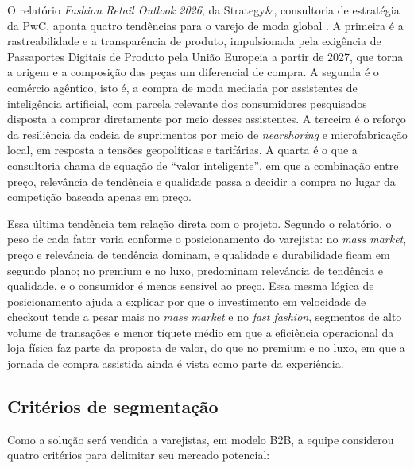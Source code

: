 O relatório \textit{Fashion Retail Outlook 2026}, da Strategy\&, consultoria de estratégia da PwC, aponta quatro tendências para o varejo de moda global \cite{strategyand2026outlook}. A primeira é a rastreabilidade e a transparência de produto, impulsionada pela exigência de Passaportes Digitais de Produto pela União Europeia a partir de 2027, que torna a origem e a composição das peças um diferencial de compra. A segunda é o comércio agêntico, isto é, a compra de moda mediada por assistentes de inteligência artificial, com parcela relevante dos consumidores pesquisados disposta a comprar diretamente por meio desses assistentes. A terceira é o reforço da resiliência da cadeia de suprimentos por meio de \textit{nearshoring} e microfabricação local, em resposta a tensões geopolíticas e tarifárias. A quarta é o que a consultoria chama de equação de ``valor inteligente'', em que a combinação entre preço, relevância de tendência e qualidade passa a decidir a compra no lugar da competição baseada apenas em preço.

Essa última tendência tem relação direta com o projeto. Segundo o relatório, o peso de cada fator varia conforme o posicionamento do varejista: no \textit{mass market}, preço e relevância de tendência dominam, e qualidade e durabilidade ficam em segundo plano; no premium e no luxo, predominam relevância de tendência e qualidade, e o consumidor é menos sensível ao preço. Essa mesma lógica de posicionamento ajuda a explicar por que o investimento em velocidade de checkout tende a pesar mais no \textit{mass market} e no \textit{fast fashion}, segmentos de alto volume de transações e menor tíquete médio em que a eficiência operacional da loja física faz parte da proposta de valor, do que no premium e no luxo, em que a jornada de compra assistida ainda é vista como parte da experiência.

\subsection{Critérios de segmentação}
\label{subsec:criterios_segmentacao}

Como a solução será vendida a varejistas, em modelo B2B, a equipe considerou quatro critérios para delimitar seu mercado potencial:

